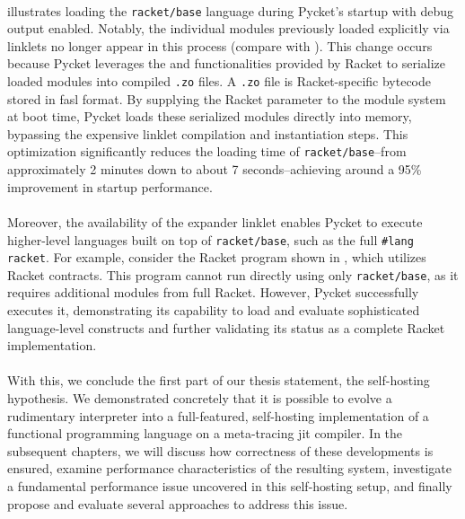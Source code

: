 
		\paragraph{}%
			 illustrates loading the \texttt{racket/base} language during Pycket's startup with debug output enabled. Notably, the individual modules previously loaded explicitly via linklets no longer appear in this process (compare with ). This change occurs because Pycket leverages the  and  functionalities provided by Racket to serialize loaded modules into compiled \texttt{.zo} files. A \texttt{.zo} file is Racket-specific bytecode stored in fasl format. By supplying the Racket parameter  to the module system at boot time, Pycket loads these serialized modules directly into memory, bypassing the expensive linklet compilation and instantiation steps. This optimization significantly reduces the loading time of \texttt{racket/base}--from approximately 2 minutes down to about 7 seconds--achieving around a 95\% improvement in startup performance.

		\paragraph{}%
			Moreover, the availability of the expander linklet enables Pycket to execute higher-level languages built on top of \texttt{racket/base}, such as the full \texttt{\#lang racket}. For example, consider the Racket program shown in , which utilizes Racket contracts. This program cannot run directly using only \texttt{racket/base}, as it requires additional modules from full Racket. However, Pycket successfully executes it, demonstrating its capability to load and evaluate sophisticated language-level constructs and further validating its status as a complete Racket implementation.


		\paragraph{}%
			With this, we conclude the first part of our thesis statement, the self-hosting hypothesis. We demonstrated concretely that it is possible to evolve a rudimentary interpreter into a full-featured, self-hosting implementation of a functional programming language on a meta-tracing \gls{jit} compiler. In the subsequent chapters, we will discuss how correctness of these developments is ensured, examine performance characteristics of the resulting system, investigate a fundamental performance issue uncovered in this self-hosting setup, and finally propose and evaluate several approaches to address this issue.





